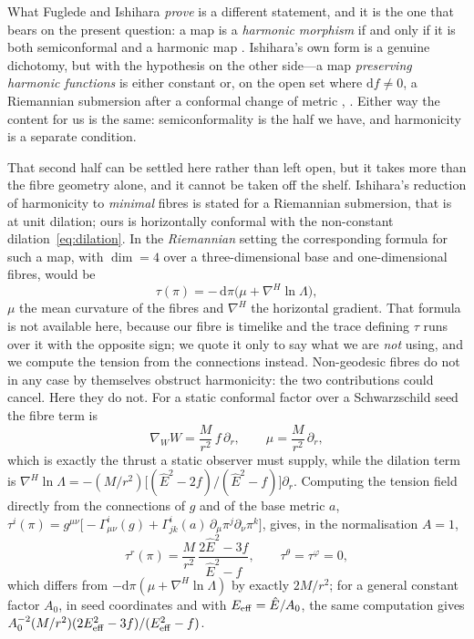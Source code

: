 \documentclass[12pt]{iopart}
\theoremstyle{plain}
\theoremstyle{definition}
\theoremstyle{remark}
\newcommand{\Ehat}{\hat E}
\newcommand{\dd}{\mathrm{d}}
\begin{document}
What Fuglede and Ishihara \emph{prove} is a different statement, and it is the one
that bears on the present question: a map is a \emph{harmonic morphism} if and only
if it is both semiconformal and a harmonic map \cite[\S7]{Fuglede1978}. Ishihara's
own form is a genuine dichotomy, but with the hypothesis on the other side---a map
\emph{preserving harmonic functions} is either constant or, on the open set where
$\dd f\neq0$, a Riemannian submersion after a conformal change of metric
\cite[Thm.~5.1]{Ishihara1979}, \cite{BairdWood2003}. Either way the content for us
is the same: semiconformality is the half we have, and harmonicity is a separate
condition.

That second half can be settled here rather than left open, but it takes more than
the fibre geometry alone, and it cannot be taken off the shelf. Ishihara's reduction
of harmonicity to \emph{minimal} fibres \cite[\S1]{Ishihara1979} is stated for a
Riemannian submersion, that is at unit dilation; ours is horizontally conformal with
the non-constant dilation~\eqref{eq:dilation}. In the \emph{Riemannian} setting the
corresponding formula for such a map, with $\dim=4$ over a three-dimensional base
and one-dimensional fibres, would be
\begin{equation}
    \tau(\pi)=-\,\dd\pi\big(\mu+\nabla^H\ln\Lambda\big),
    \label{eq:tension}
\end{equation}
$\mu$ the mean curvature of the fibres and $\nabla^H$ the horizontal gradient. That
formula is not available here, because our fibre is timelike and the trace defining
$\tau$ runs over it with the opposite sign; we quote it only to say what we are
\emph{not} using, and we compute the tension from the connections instead. Non-geodesic
fibres do not in any case by themselves obstruct harmonicity: the two contributions
could cancel. Here they do not. For a static
conformal factor over a Schwarzschild seed the fibre term is
\begin{equation}
    \nabla_WW=\frac{M}{r^2}\,f\,\partial_r ,
    \qquad \mu=\frac{M}{r^2}\,\partial_r ,
    \label{eq:fibre-accel}
\end{equation}
which is exactly the thrust a static observer must supply, while the dilation term
is $\nabla^H\ln\Lambda=-(M/r^2)\big[(\Ehat^2-2f)/(\Ehat^2-f)\big]\partial_r$.
Computing the tension field directly from the connections of $g$ and of the base
metric $a$, $\tau^i(\pi)=g^{\mu\nu}\big[-\Gamma^{i}_{\mu\nu}(g)
+\Gamma^i_{jk}(a)\,\partial_\mu\pi^j\partial_\nu\pi^k\big]$, gives, in the
normalisation $A=1$,
\begin{equation}
    \tau^r(\pi)=\frac{M}{r^2}\,\frac{2\Ehat^2-3f}{\Ehat^2-f},
    \qquad \tau^\theta=\tau^\varphi=0 ,
    \label{eq:tension-residual}
\end{equation}
which differs from $-\dd\pi(\mu+\nabla^H\ln\Lambda)$ by exactly $2M/r^2$; for a
general constant factor $A_0$, in seed coordinates and with $E_{\rm eff}=\Ehat/A_0$, the same
computation gives $A_0^{-2}(M/r^2)(2E_{\rm eff}^2-3f)/(E_{\rm eff}^2-f)$.
\end{document}

